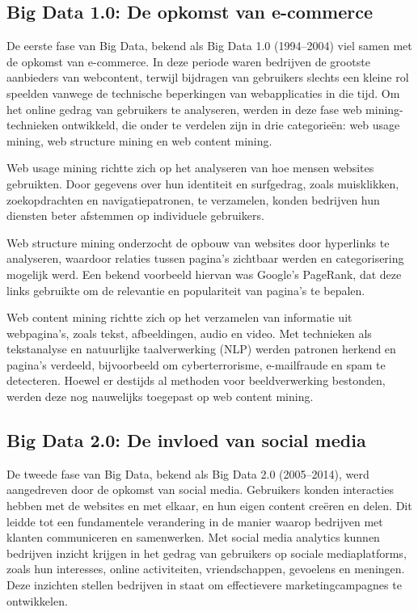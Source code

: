 \subsection{Big Data 1.0: De opkomst van e-commerce}  

De eerste fase van Big Data, bekend als Big Data 1.0 (1994–2004) viel samen met de opkomst van e-commerce. In deze periode waren bedrijven de grootste aanbieders van webcontent, terwijl bijdragen van gebruikers slechts een kleine rol speelden vanwege de technische beperkingen van webapplicaties in die tijd. Om het online gedrag van gebruikers te analyseren, werden in deze fase web mining-technieken ontwikkeld, die onder te verdelen zijn in drie categorieën: web usage mining, web structure mining en web content mining.

\vspace{1 em}

Web usage mining richtte zich op het analyseren van hoe mensen websites gebruikten. Door gegevens over hun identiteit en surfgedrag, zoals muisklikken, zoekopdrachten en navigatiepatronen, te verzamelen, konden bedrijven hun diensten beter afstemmen op individuele gebruikers.

\vspace{1 em}

Web structure mining onderzocht de opbouw van websites door hyperlinks te analyseren, waardoor relaties tussen pagina’s zichtbaar werden en categorisering mogelijk werd. Een bekend voorbeeld hiervan was Google’s PageRank, dat deze links gebruikte om de relevantie en populariteit van pagina’s te bepalen.

\vspace{1 em}

Web content mining richtte zich op het verzamelen van informatie uit webpagina’s, zoals tekst, afbeeldingen, audio en video. Met technieken als tekstanalyse en natuurlijke taalverwerking (NLP) werden patronen herkend en pagina’s verdeeld, bijvoorbeeld om cyberterrorisme, e-mailfraude en spam te detecteren. Hoewel er destijds al methoden voor beeldverwerking bestonden, werden deze nog nauwelijks toegepast op web content mining.


\subsection{Big Data 2.0: De invloed van social media}  

De tweede fase van Big Data, bekend als Big Data 2.0 (2005–2014), werd aangedreven door de opkomst van social media. Gebruikers konden interacties hebben met de websites en met elkaar, en hun eigen content creëren en delen. Dit leidde tot een fundamentele verandering in de manier waarop bedrijven met klanten communiceren en samenwerken. Met social media analytics kunnen bedrijven inzicht krijgen in het gedrag van gebruikers op sociale mediaplatforms, zoals hun interesses, online activiteiten, vriendschappen, gevoelens en meningen. Deze inzichten stellen bedrijven in staat om effectievere marketingcampagnes te ontwikkelen.



